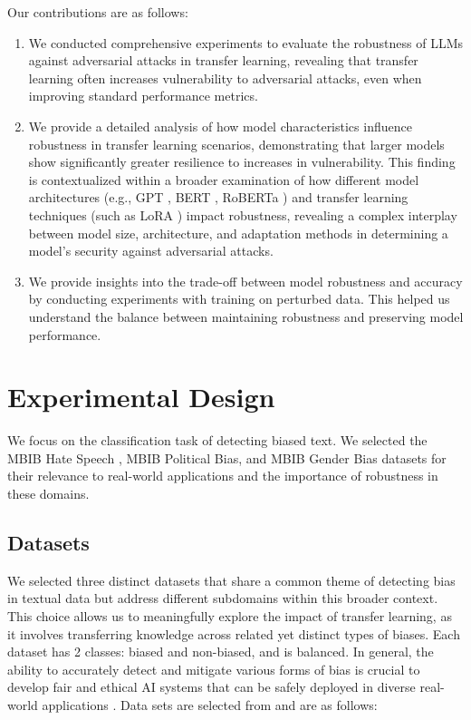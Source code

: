 \documentclass{article}
\begin{document}
Our contributions are as follows:
\begin{enumerate}
\item We conducted comprehensive experiments to evaluate the robustness of LLMs against adversarial attacks in transfer learning, revealing that transfer learning often increases vulnerability to adversarial attacks, even when improving standard performance metrics.

\item We provide a detailed analysis of how model characteristics influence robustness in transfer learning scenarios, demonstrating that larger models show significantly greater resilience to increases in vulnerability. This finding is contextualized within a broader examination of how different model architectures (e.g., GPT \citep{radford2019language}, BERT \cite{devlin2018bert}, RoBERTa \cite{liu2019roberta}) and transfer learning techniques (such as LoRA \cite{hu2021lora}) impact robustness, revealing a complex interplay between model size, architecture, and adaptation methods in determining a model's security against adversarial attacks.

\item We provide insights into the trade-off between model robustness and accuracy by conducting experiments with training on perturbed data. This helped us understand the balance between maintaining robustness and preserving model performance.
\end{enumerate}

\section{Experimental Design}
We focus on the classification task of detecting biased text. We selected the MBIB Hate Speech \cite{wessel2023introducing}, MBIB Political Bias, and MBIB Gender Bias datasets for their relevance to real-world applications and the importance of robustness in these domains. 



\subsection{Datasets}
We selected three distinct datasets that share a common theme of detecting bias in textual data but address different subdomains within this broader context. This choice allows us to meaningfully explore the impact of transfer learning, as it involves transferring knowledge across related yet distinct types of biases. Each dataset has 2 classes: biased and non-biased, and is balanced. In general, the ability to accurately detect and mitigate various forms of bias is crucial to develop fair and ethical AI systems that can be safely deployed in diverse real-world applications \cite{hendrycks2023overview}. Data sets are selected from \cite{wessel2023introducing} and are as follows: 
\end{document}
